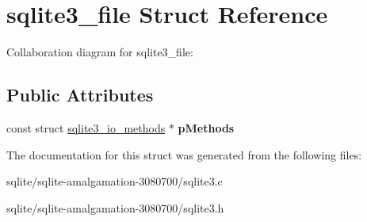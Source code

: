 \hypertarget{structsqlite3__file}{\section{sqlite3\+\_\+file Struct Reference}
\label{structsqlite3__file}
}


Collaboration diagram for sqlite3\+\_\+file\+:
\subsection*{Public Attributes}
\begin{DoxyCompactItemize}
\item 
\hypertarget{structsqlite3__file_afbe27b40382393e63784a4d4b43f3ad7}{const struct \hyperlink{structsqlite3__io__methods}{sqlite3\+\_\+io\+\_\+methods} $\ast$ {\bfseries p\+Methods}}\label{structsqlite3__file_afbe27b40382393e63784a4d4b43f3ad7}

\end{DoxyCompactItemize}


The documentation for this struct was generated from the following files\+:\begin{DoxyCompactItemize}
\item 
sqlite/sqlite-\/amalgamation-\/3080700/sqlite3.\+c\item 
sqlite/sqlite-\/amalgamation-\/3080700/sqlite3.\+h\end{DoxyCompactItemize}
